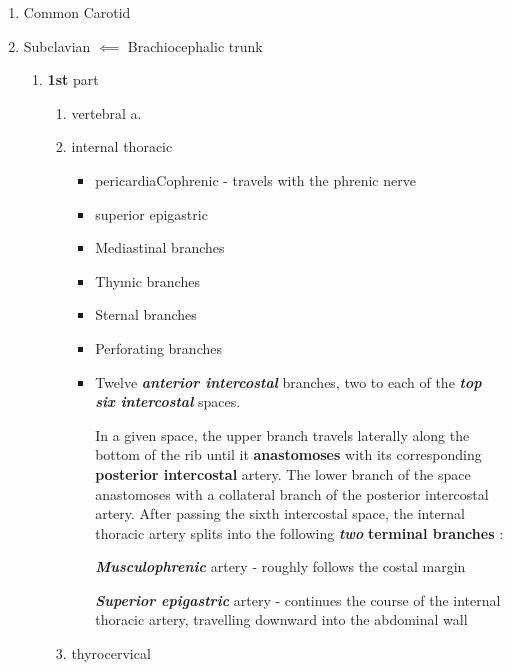 \documentclass[10pt]{amsart}
\numberwithin{theorem}{section}
\numberwithin{example}{section}
\theoremstyle{definition}
\theoremstyle{remark}
\begin{document}
\begin{enumerate}

\item  Common Carotid 

\vspace{3pt}

\item Subclavian $\impliedby$ Brachiocephalic trunk 


\begin{enumerate}
    \item \textbf{1st} part 
    
    \begin{enumerate}
        \item vertebral a. 
        \item  internal thoracic
        \begin{itemize}
            \item pericardiaCophrenic  - travels with the phrenic nerve
            
            \item  superior epigastric 
            
            \item    Mediastinal branches
    \item Thymic branches
    \item  Sternal branches
\item Perforating branches

\item  
Twelve \textit{\textbf{anterior intercostal}} branches, two to each of the \textit{\textbf{top six intercostal}}  spaces.


 In a given space, the upper branch travels laterally along the bottom of the rib until it \textbf{anastomoses} with its corresponding \textbf{posterior intercostal} artery. The lower branch of the space anastomoses with a collateral branch of the posterior intercostal artery.
After passing the sixth intercostal space, the internal thoracic artery splits into the following \textit{\textbf{two}} \textbf{terminal branches} :

\textit{\textbf{Musculophrenic}}  artery - roughly follows the costal margin


\textit{\textbf{Superior epigastric}} artery - continues the course of the internal thoracic artery, travelling downward into the abdominal wall
        \end{itemize}
        \item thyrocervical 
    \end{enumerate}
    

\end{enumerate}
\end{enumerate}
\end{document}
